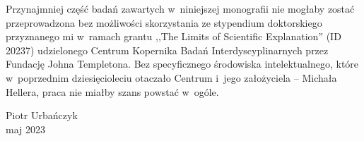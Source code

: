Przynajmniej część badań zawartych w~niniejszej monografii nie mogłaby zostać przeprowadzona bez możliwości skorzystania ze stypendium doktorskiego przyznanego mi w~ramach grantu ,,The Limits of Scientific Explanation'' (ID 20237) udzielonego Centrum Kopernika Badań Interdyscyplinarnych przez Fundację Johna Templetona. Bez specyficznego środowiska intelektualnego, które w~poprzednim dziesięcioleciu otaczało Centrum i~jego założyciela -- Michała Hellera, praca nie miałby szans powstać w~ogóle.

\begin{flushright}
Piotr Urbańczyk\\
maj 2023
\end{flushright}